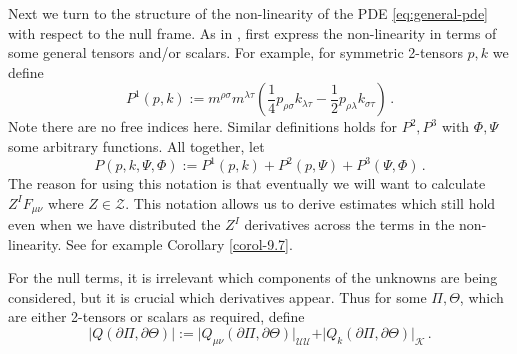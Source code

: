 \documentclass[11pt, a4paper]{amsart}
\numberwithin{equation}{section}
\numberwithin{theorem}{section}
\newcommand{\p}{\partial}
\newcommand{\mn}{{\mu \nu}}
\newcommand{\UU}{{\mathcal{U} \mathcal{U}}}
\newcommand{\K}{\mathcal{K}}
\begin{document}
Next we turn to the structure of the non-linearity of the PDE \eqref{eq:general-pde} with respect to the null frame.
As in \cite{LR:04}, first express the non-linearity in terms of some general tensors and/or scalars. For example, for symmetric 2-tensors $p, k$ we define
$$ P^1(p, k) := m^{\rho \sigma} m^{\lambda \tau} \left( \frac{1}{4}  p_{\rho \sigma} k_{\lambda \tau} - \frac{1}{2}  p_{\rho \lambda} k_{\sigma \tau} \right) \,.$$
Note there are no free indices here. Similar definitions holds for $P^2, P^3$ with $\Phi, \Psi$ some arbitrary functions. All together, let
$$ P(p, k, \Psi, \Phi) := P^1(p, k) + P^2 (p, \Psi) + P^3(\Psi, \Phi) \,.$$
The reason for using this notation is that eventually we will want to calculate $Z^I F_\mn$ where $Z \in \mathcal{Z}$. This notation allows us to derive estimates which still hold even when we have distributed the $Z^I$ derivatives across the terms in the non-linearity. See for example Corollary \ref{corol-9.7}. 

For the null terms, it is irrelevant which components of the unknowns are being considered, but it is crucial which derivatives appear. Thus for some $\Pi, \Theta$, which are either 2-tensors or scalars as required, define
\begin{equation} \vert Q(\p \Pi, \p \Theta) \vert := \vert Q_\mn (\p \Pi, \p \Theta) \vert_\UU + \vert Q_k ( \p \Pi, \p \Theta) \vert_\K \,. \label{eq:null-norm} \end{equation}
\end{document}
